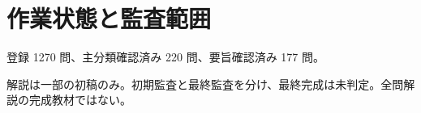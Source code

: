 \chapter{作業状態と監査範囲}
登録 1270 問、主分類確認済み 220 問、要旨確認済み 177 問。
\par 解説は一部の初稿のみ。初期監査と最終監査を分け、最終完成は未判定。全問解説の完成教材ではない。
